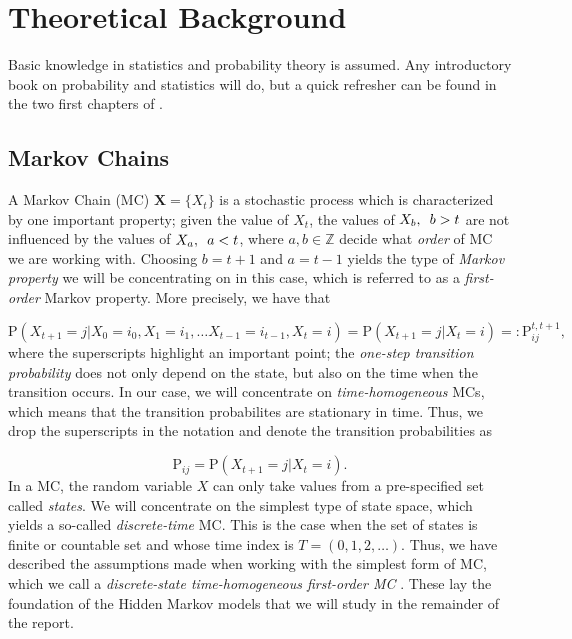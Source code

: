 \documentclass{article}\usepackage[]{graphicx}\usepackage[]{color}
\begin{document}
\section{Theoretical Background}

Basic knowledge in statistics and probability theory is assumed. Any introductory book on probability and statistics will do, but a quick refresher can be found in the two first chapters of \cite{Pinsky2011}.

\subsection{Markov Chains}
A Markov Chain (MC) $\mathbf{X} = \{X_t\}$ is a stochastic process which is characterized by one important property; given the value of $X_t$, the values of $X_b, \hspace{0.5em} b > t$ are not influenced by the values of $X_a, \hspace{0.5em} a < t$, where $a,b \in \mathbb{Z}$ decide what \textit{order} of MC we are working with. Choosing $b = t+1$ and $a = t-1$ yields the type of \textit{Markov property} we will be concentrating on in this case, which is referred to as a \textit{first-order} Markov property. More precisely, we have that 

\begin{equation*}
     \text{P}(X_{t+1} = j|X_0 = i_0, X_1 = i_1, \ldots X_{t-1} = i_{t-1}, X_t = i) = \text{P}(X_{t+1} = j|X_t = i) =: \text{P}_{ij}^{t, t+1}, 
\end{equation*}
where the superscripts highlight an important point; the \textit{one-step transition probability} does not only depend on the state, but also on the time when the transition occurs. In our case, we will concentrate on \textit{time-homogeneous} MCs, which means that the transition probabilites are stationary in time. Thus, we drop the superscripts in the notation and denote the transition probabilities as 

\begin{equation*}
    \text{P}_{ij} = \text{P}(X_{t+1} = j|X_t = i).
\end{equation*}
In a MC, the random variable $X$ can only take values from a pre-specified set called \textit{states}. We will concentrate on the simplest type of state space, which yields a so-called \textit{discrete-time} MC. This is the case when the set of states is finite or countable set and whose time index is $T = (0,1,2,\ldots)$. Thus, we have described the assumptions made when working with the simplest form of MC, which we call a \textit{discrete-state time-homogeneous first-order MC} \cite{Pinsky2011}. These lay the foundation of the Hidden Markov models that we will study in the remainder of the report. 
\end{document}
